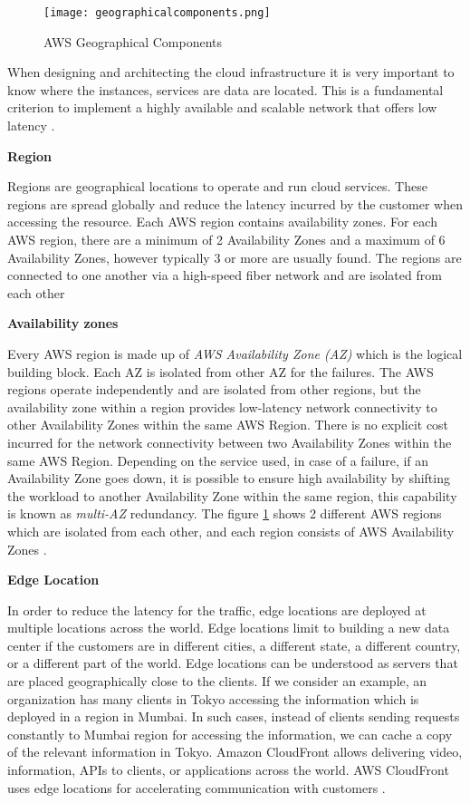 \begin{figure}
    \centering
    \texttt{[image: geographicalcomponents.png]}
    \caption{AWS Geographical Components}{\cite{16}}
    \label{fig:identities}
\end{figure}

\par When designing and architecting the cloud infrastructure it is very important to know where the instances, services are data are located.
This is a fundamental criterion to implement a highly
available and scalable network that offers low latency
\cite{20}.


\textbf{Region}
\par Regions are geographical locations to operate and run cloud services.
These regions are spread globally and reduce the latency incurred by the customer when accessing the resource.
Each AWS region contains availability zones.
For each AWS region, there are a minimum of 2 Availability
Zones and a
maximum of 6 Availability Zones, however typically 3 or more are usually found.
The regions are connected to one another via a high-speed
fiber network and are isolated from each other \cite{21}


\textbf{Availability zones}
\par Every AWS region is made up of \textit{AWS
Availability Zone (AZ)} which is the logical building block.
Each AZ is isolated from other AZ for the failures.
The AWS regions operate independently and are isolated from other regions, but the availability zone within a region provides low-latency network connectivity to other Availability Zones within the same AWS Region.
There is no explicit cost incurred for the network connectivity between two Availability Zones within the same AWS Region.
Depending on the service used, in case of a failure, if
an Availability Zone goes down, it is possible to ensure high availability by shifting the workload to another Availability Zone within the same region, this capability is known as \textit{multi-AZ} redundancy.
The figure \ref{fig:identities} shows 2 different AWS
regions which are isolated from each other, and each
region consists of AWS Availability Zones \cite{22}.

\textbf{Edge Location}
\par In order to reduce the latency for the traffic, edge locations are deployed at multiple locations across the
world. Edge locations limit to building a new data center
if the customers are in different cities, a different
state, a different
country, or a different
part of the world. Edge locations can be understood as servers that are placed geographically close to the clients.
If we consider an example, an organization has many clients in Tokyo accessing the information which is deployed in a
region in Mumbai. In such cases, instead of clients sending requests constantly to Mumbai region for accessing the
information, we can cache a copy of the relevant information in Tokyo. Amazon CloudFront allows delivering video,
information, APIs to clients, or applications across the world. AWS CloudFront uses edge locations for accelerating
communication with customers \cite{23}.

